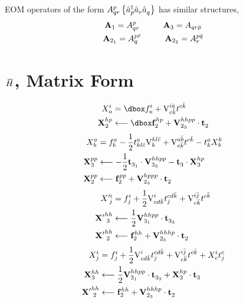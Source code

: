 \documentclass[thesis.tex]{subfiles}
\begin{document}
EOM operators of the form $A^{p}_{qr}\left\{\hat{a}_{p}^{\dagger}\hat{a}_{r}^{}\hat{a}_{q}^{}\right\}$ has similar structures,
\begin{gather}
  \mathbf{A}_{1} = A^{p}_{qr} \hspace{1cm} \mathbf{A}_{3} = A_{qr\bar{p}} \notag \\
  \mathbf{A}_{2_{1}} = A^{p\bar{r}}_{q} \hspace{1.0cm} \mathbf{A}_{2_{2}} = A^{p\bar{q}}_{r}
\end{gather}

\section{$\EHam$, Matrix Form}

\begin{align}
  \xint{i}{a} &= \dboxed{\fint{i}{a}} + \vint{i\bar{a}}{c\bar{k}}\tamp{c\bar{k}}{} \notag \\
  \bxint{hp}{2} &\longleftarrow \dboxed{\bfint{hp}{2}} + \bvint{hhpp}{2_{3}}\cdot\btamp{}{2}
\end{align}
\begin{align}
  X^{a}_{\hspace{0.3pt} b} &= f^{a}_{b} - \frac{1}{2}t^{a}_{kl\bar{c}}\text{V}^{kl\bar{c}}_{b} + \text{V}^{a\bar{b}}_{c\bar{k}}t^{c\bar{k}}_{} - t^{a}_{k}X^{k}_{\hspace{0.3pt} b} \notag \\
  \mathbf{X}^{pp}_{\hspace{0.3pt} 3} &\longleftarrow -\frac{1}{2}\mathbf{t}^{}_{3_{1}}\cdot\text{\textbf{V}}^{hhpp}_{3_{3}} - \mathbf{t}^{}_{3}\cdot\mathbf{X}^{hp}_{\hspace{0.3pt} 3} \notag \\
  \mathbf{X}^{pp}_{\hspace{0.3pt} 2} &\longleftarrow \mathbf{f}^{pp}_{2} + \text{\textbf{V}}^{hppp}_{2_{4}}\cdot\mathbf{t}^{}_{2}
\end{align}
\begin{align}
  X'^{i}_{\hspace{2.3pt} j} &= f^{i}_{j} + \frac{1}{2}\text{V}^{i}_{cd\bar{k}}t^{cd\bar{k}}_{j} + \text{V}^{i\bar{j}}_{c\bar{k}}t^{c\bar{k}}_{} \notag \\
  \mathbf{X'}^{hh}_{\hspace{2.3pt} 3} &\longleftarrow \frac{1}{2}\text{\textbf{V}}^{hhpp}_{3_{1}}\cdot\mathbf{t}^{}_{3_{3}} \notag \\
  \mathbf{X'}^{hh}_{\hspace{2.3pt} 2} &\longleftarrow \mathbf{f}^{hh}_{2} + \text{\textbf{V}}^{hhhp}_{2_{3}}\cdot\mathbf{t}^{}_{2}
\end{align}
\begin{align}
  X^{i}_{\hspace{0.3pt} j} &= f^{i}_{j} + \frac{1}{2}\text{V}^{i}_{cd\bar{k}}t^{cd\bar{k}}_{j} + \text{V}^{i\bar{j}}_{c\bar{k}}t^{c\bar{k}}_{} + X^{i}_{\hspace{0.3pt} c}t^{c}_{j} \notag \\
  \mathbf{X}^{hh}_{\hspace{0.3pt} 3} &\longleftarrow \frac{1}{2}\text{\textbf{V}}^{hhpp}_{3_{1}}\cdot\mathbf{t}^{}_{3_{3}} + \mathbf{X}^{hp}_{\hspace{0.3pt} 3}\cdot\mathbf{t}^{}_{3} \notag \\
  \mathbf{X'}^{hh}_{\hspace{2.3pt} 2} &\longleftarrow \mathbf{f}^{hh}_{2} + \text{\textbf{V}}^{hhhp}_{2_{3}}\cdot\mathbf{t}^{}_{2}
\end{align}
\end{document}
